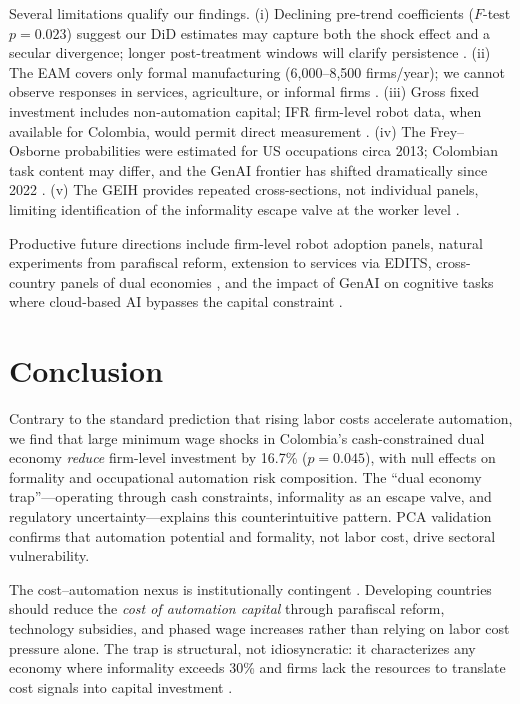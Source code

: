 \documentclass[5p,times,authoryear]{elsarticle}
\begin{document}
Several limitations qualify our findings.
%
(i) Declining pre-trend coefficients ($F$-test $p = 0.023$) suggest our DiD estimates may capture both the shock effect and a secular divergence; longer post-treatment windows will clarify persistence \citep{autor2018automation}.
%
(ii) The EAM covers only formal manufacturing (6,000--8,500 firms/year); we cannot observe responses in services, agriculture, or informal firms \citep{perry2007informality}.
%
(iii) Gross fixed investment includes non-automation capital; IFR firm-level robot data, when available for Colombia, would permit direct measurement \citep{diao2021manufacturing}.
%
(iv) The Frey--Osborne probabilities were estimated for US occupations circa 2013; Colombian task content may differ, and the GenAI frontier has shifted dramatically since 2022 \citep{atkin2017organizational, eloundou2023gpts}.
%
(v) The GEIH provides repeated cross-sections, not individual panels, limiting identification of the informality escape valve at the worker level \citep{levy2008good}.

Productive future directions include firm-level robot adoption panels, natural experiments from parafiscal reform, extension to services via EDITS, cross-country panels of dual economies \citep{hallward2018trouble}, and the impact of GenAI on cognitive tasks where cloud-based AI bypasses the capital constraint \citep{korinek2021ai}.


\section{Conclusion}
\label{sec:conclusion}

Contrary to the standard prediction that rising labor costs accelerate automation, we find that large minimum wage shocks in Colombia's cash-constrained dual economy \emph{reduce} firm-level investment by 16.7\% ($p = 0.045$), with null effects on formality and occupational automation risk composition. The ``dual economy trap''---operating through cash constraints, informality as an escape valve, and regulatory uncertainty---explains this counterintuitive pattern. PCA validation confirms that automation potential and formality, not labor cost, drive sectoral vulnerability.

The cost--automation nexus is institutionally contingent \citep{kuznets1973modern, lewis1954economic}. Developing countries should reduce the \emph{cost of automation capital} through parafiscal reform, technology subsidies, and phased wage increases rather than relying on labor cost pressure alone. The trap is structural, not idiosyncratic: it characterizes any economy where informality exceeds 30\% and firms lack the resources to translate cost signals into capital investment \citep{worldbank2019wdr, ilo2024outlook}.
\end{document}
